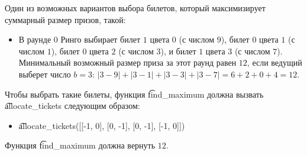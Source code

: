 Один из возможных вариантов выбора билетов, который максимизирует суммарный размер призов, такой:
\begin{itemize}
\item В раунде $0$ Ринго выбирает билет $1$ цвета $0$ (с числом $9$), билет $0$ цвета $1$ (с числом $1$), билет $0$ цвета $2$ (с числом $3$), и билет $1$ цвета $3$ (с числом $7$). Минимальный возможный размер приза за этот раунд равен $12$, если ведущий выберет число $b = 3$: $|3 - 9| + |3 - 1| + |3 - 3| + |3 - 7| = 6 + 2 + 0 + 4 = 12$.
\end{itemize}

Чтобы выбрать такие билеты, функция \t{find\_maximum} должна вызвать \t{allocate\_tickets} следующим образом:
\begin{itemize}
\item \t{allocate\_tickets([[-1, 0], [0, -1], [0, -1], [-1, 0]])}
\end{itemize}

Функция \t{find\_maximum} должна вернуть $12$.